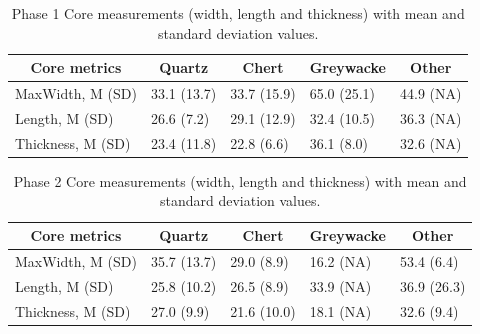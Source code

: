 \documentclass[12pt,twoside]{reedthesis}
\begin{document}
\begin{table}[!h]

\caption{\label{tab:unnamed-chunk-60}Phase 1 Core measurements (width, length and thickness) with mean and standard deviation values.}
\centering
\begin{tabular}[t]{lllll}
\toprule
\multicolumn{1}{c}{\textbf{Core metrics}} & \multicolumn{1}{c}{\textbf{Quartz}} & \multicolumn{1}{c}{\textbf{Chert}} & \multicolumn{1}{c}{\textbf{Greywacke}} & \multicolumn{1}{c}{\textbf{Other}}\\
\midrule
MaxWidth, M (SD) & 33.1 (13.7) & 33.7 (15.9) & 65.0 (25.1) & 44.9 (NA)\\
Length, M (SD) & 26.6 (7.2) & 29.1 (12.9) & 32.4 (10.5) & 36.3 (NA)\\
Thickness, M (SD) & 23.4 (11.8) & 22.8 (6.6) & 36.1 (8.0) & 32.6 (NA)\\
\bottomrule
\end{tabular}
\end{table}
\begin{table}[!h]

\caption{\label{tab:unnamed-chunk-61}Phase 2 Core measurements (width, length and thickness) with mean and standard deviation values.}
\centering
\begin{tabular}[t]{lllll}
\toprule
\multicolumn{1}{c}{\textbf{Core metrics}} & \multicolumn{1}{c}{\textbf{Quartz}} & \multicolumn{1}{c}{\textbf{Chert}} & \multicolumn{1}{c}{\textbf{Greywacke}} & \multicolumn{1}{c}{\textbf{Other}}\\
\midrule
MaxWidth, M (SD) & 35.7 (13.7) & 29.0 (8.9) & 16.2 (NA) & 53.4 (6.4)\\
Length, M (SD) & 25.8 (10.2) & 26.5 (8.9) & 33.9 (NA) & 36.9 (26.3)\\
Thickness, M (SD) & 27.0 (9.9) & 21.6 (10.0) & 18.1 (NA) & 32.6 (9.4)\\
\bottomrule
\end{tabular}
\end{table}
\end{document}
